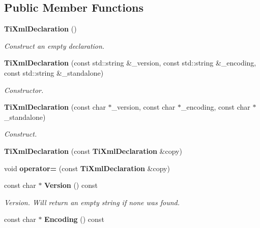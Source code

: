 \subsection*{Public Member Functions}
\begin{CompactItemize}
\item 
{\bf Ti\-Xml\-Declaration} ()\label{classTiXmlDeclaration_TiXmlDeclarationa0}

\begin{CompactList}\small\item\em Construct an empty declaration. \item\end{CompactList}\item 
{\bf Ti\-Xml\-Declaration} (const std::string \&\_\-version, const std::string \&\_\-encoding, const std::string \&\_\-standalone)\label{classTiXmlDeclaration_TiXmlDeclarationa1}

\begin{CompactList}\small\item\em Constructor. \item\end{CompactList}\item 
{\bf Ti\-Xml\-Declaration} (const char $\ast$\_\-version, const char $\ast$\_\-encoding, const char $\ast$\_\-standalone)\label{classTiXmlDeclaration_TiXmlDeclarationa2}

\begin{CompactList}\small\item\em Construct. \item\end{CompactList}\item 
{\bf Ti\-Xml\-Declaration} (const {\bf Ti\-Xml\-Declaration} \&copy)\label{classTiXmlDeclaration_TiXmlDeclarationa3}

\item 
void {\bf operator=} (const {\bf Ti\-Xml\-Declaration} \&copy)\label{classTiXmlDeclaration_TiXmlDeclarationa4}

\item 
const char $\ast$ {\bf Version} () const\label{classTiXmlDeclaration_TiXmlDeclarationa6}

\begin{CompactList}\small\item\em Version. Will return an empty string if none was found. \item\end{CompactList}\item 
const char $\ast$ {\bf Encoding} () const\label{classTiXmlDeclaration_TiXmlDeclarationa7}


\end{CompactItemize}
